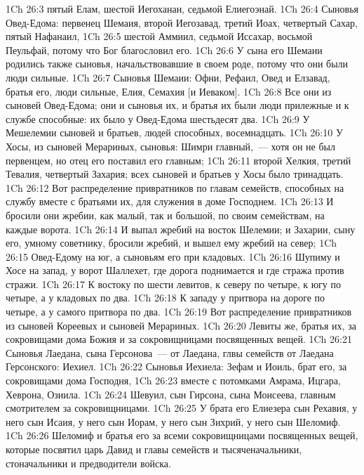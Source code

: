 \vs 1Ch 26:3 пятый Елам, шестой Иегоханан, седьмой Елиегоэнай.
\vs 1Ch 26:4 Сыновья Овед-Едома: первенец Шемаия, второй Иегозавад, третий Иоах, четвертый Сахар, пятый Нафанаил,
\vs 1Ch 26:5 шестой Аммиил, седьмой Иссахар, восьмой Пеульфай, потому что Бог благословил его.
\vs 1Ch 26:6 У сына его Шемаии родились также сыновья, начальствовавшие в своем роде, потому что они были люди сильные.
\vs 1Ch 26:7 Сыновья Шемаии: Офни, Рефаил, Овед и Елзавад, братья его, люди сильные, Елия, Семахия [и Иеваком].
\vs 1Ch 26:8 Все они из сыновей Овед-Едома; они и сыновья их, и братья их были люди прилежные и к службе способные: их было у Овед-Едома шестьдесят два.
\vs 1Ch 26:9 У Мешелемии сыновей и братьев, людей способных,  восемнадцать.
\vs 1Ch 26:10 У Хосы, из сыновей Мерариных, сыновья: Шимри главный,~--- хотя он не был первенцем, но отец его поставил его главным;
\vs 1Ch 26:11 второй Хелкия, третий Тевалия, четвертый Захария; всех сыновей и братьев у Хосы было тринадцать.
\vs 1Ch 26:12 Вот распределение привратников по главам семейств, способных на службу вместе с братьями их, для служения в доме Господнем.
\vs 1Ch 26:13 И бросили они жребии, как малый, так и большой, по своим семействам, на каждые ворота.
\vs 1Ch 26:14 И выпал жребий на восток Шелемии; и Захарии, сыну его, умному советнику, бросили жребий, и вышел ему жребий на север;
\vs 1Ch 26:15 Овед-Едому на юг, а сыновьям его при кладовых.
\vs 1Ch 26:16 Шупиму и Хосе на запад, у ворот Шаллехет, где дорога поднимается и где стража против стражи.
\vs 1Ch 26:17 К востоку по шести левитов, к северу по четыре, к югу по четыре, а у кладовых по два.
\vs 1Ch 26:18 К западу у притвора на дороге по четыре, а у самого притвора по два.
\vs 1Ch 26:19 Вот распределение привратников из сыновей Кореевых и сыновей Мерариных.
\rsbpar\vs 1Ch 26:20 Левиты же, братья их,  за сокровищами дома Божия и за сокровищницами посвященных вещей.
\vs 1Ch 26:21 Сыновья Лаедана, сына Герсонова~--- от Лаедана, глвы семейств от Лаедана Герсонского: Иехиел.
\vs 1Ch 26:22 Сыновья Иехиела: Зефам и Иоиль, брат его,  за сокровищами дома Господня,
\vs 1Ch 26:23 вместе с потомками Амрама, Ицгара, Хеврона, Озиила.
\vs 1Ch 26:24 Шевуил, сын Гирсона, сына Моисеева,  главным смотрителем за сокровищницами.
\vs 1Ch 26:25 У брата его Елиезера сын Рехавия, у него сын Исаия, у него сын Иорам, у него сын Зихрий, у него сын Шеломиф.
\vs 1Ch 26:26 Шеломиф и братья его  за всеми сокровищницами посвященных вещей, которые посвятил царь Давид и главы семейств и тысяченачальники, стоначальники и предводители войска.
